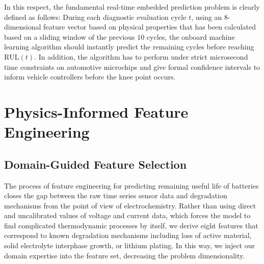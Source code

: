 \documentclass[pdflatex,sn-mathphys-num]{sn-jnl}%
\theoremstyle{thmstyleone}%
\theoremstyle{thmstyletwo}%
\theoremstyle{thmstylethree}%
\begin{document}
In this respect, the fundamental real-time embedded prediction problem is clearly defined as follows: During each diagnostic evaluation cycle $t$, using an $8$-dimensional feature vector based on physical properties that has been calculated based on a sliding window of the previous $10$ cycles, the onboard machine learning algorithm should instantly predict the remaining cycles before reaching $\text{RUL}(t)$. In addition, the algorithm has to perform under strict microsecond time constraints on automotive microchips and give formal confidence intervals to inform vehicle controllers before the knee point occurs.

\section{Physics-Informed Feature Engineering}\label{sec4}

\subsection{Domain-Guided Feature Selection}\label{subsec:domain_features}

The process of feature engineering for predicting remaining useful life of batteries closes the gap between the raw time series sensor data and degradation mechanisms from the point of view of electrochemistry. Rather than using direct and uncalibrated values of voltage and current data, which forces the model to find complicated thermodynamic processes by itself, we derive eight features that correspond to known degradation mechanisms including loss of active material, solid electrolyte interphase growth, or lithium plating. In this way, we inject our domain expertise into the feature set, decreasing the problem dimensionality.
\end{document}
